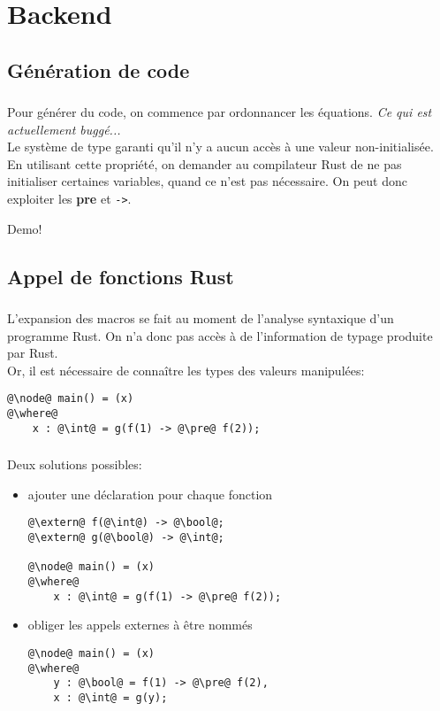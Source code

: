 \documentclass[professionalfonts]{beamer}
\makeatletter
\newcommand*{\currentname}{\@currentlabelname}
\newcommand{\keyword}[1]{{\color{green!50!black}\bf{#1}}}
\newcommand{\pre}{\keyword{pre}}
\makeatother
\begin{document}
\section{Backend}
\subsection{Génération de code}
\begin{frame}[fragile]
  \frametitle{\currentname}

  Pour générer du code, on commence par ordonnancer les équations.\pause{} \emph{Ce qui est
    actuellement buggé...}\pause\\
  Le système de type garanti qu'il n'y a aucun accès à une valeur non-initialisée.\pause\\
  En utilisant cette propriété, on demander au compilateur Rust de ne pas initialiser certaines
  variables, quand ce n'est pas nécessaire. On peut donc exploiter les \pre{} et \verb`->`.\pause
  \begin{center}
    Demo!
  \end{center}
\end{frame}

\subsection{Appel de fonctions Rust}
\begin{frame}[fragile]
  \frametitle{\currentname}

  L'expansion des macros se fait au moment de l'analyse syntaxique d'un programme Rust. On n'a
  donc pas accès à de l'information de typage produite par Rust.\pause\\
  Or, il est nécessaire de connaître les types des valeurs manipulées:
  \begin{verbatim}
@\node@ main() = (x)
@\where@
    x : @\int@ = g(f(1) -> @\pre@ f(2));
  \end{verbatim}
\end{frame}
\begin{frame}[fragile]
  \frametitle{\currentname}

  Deux solutions possibles:\pause
  \begin{itemize}
  \item ajouter une déclaration pour chaque fonction
    \begin{verbatim}
@\extern@ f(@\int@) -> @\bool@;
@\extern@ g(@\bool@) -> @\int@;

@\node@ main() = (x)
@\where@
    x : @\int@ = g(f(1) -> @\pre@ f(2));
    \end{verbatim}
    \pause
  \item obliger les appels externes à être nommés
    \begin{verbatim}
@\node@ main() = (x)
@\where@
    y : @\bool@ = f(1) -> @\pre@ f(2),
    x : @\int@ = g(y);
    \end{verbatim}
  \end{itemize}
\end{frame}
\end{document}
